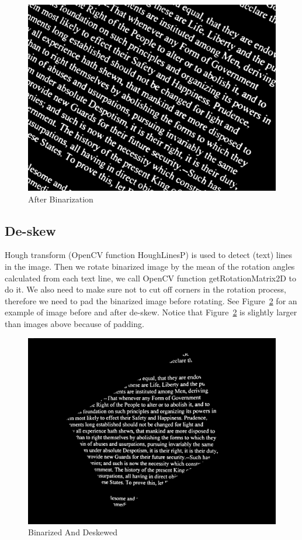 \documentclass[conference]{IEEEtran}
\begin{document}
\begin{figure}
\center
\includegraphics[scale=0.15]{src_image.jpg}
\caption{After Binarization}
\label{noskewbinarized}
\end{figure}

\subsection{De-skew}

Hough transform (OpenCV function HoughLinesP) is used to detect (text) lines in the image.  Then we rotate binarized image by the mean of the rotation angles calculated from each text line, we call OpenCV function getRotationMatrix2D to do it.  We also need to make sure not to cut off corners in the rotation process, therefore we need to pad the binarized image before rotating.  See Figure~\ref{deskewed} for an example of image before and after de-skew.  Notice that Figure~\ref{deskewed} is slightly larger than images above because of padding.

\begin{figure}
\center
\includegraphics[scale=0.10]{deskewedImage.jpg}
\caption{Binarized And Deskewed}
\label{deskewed}
\end{figure}
\end{document}

